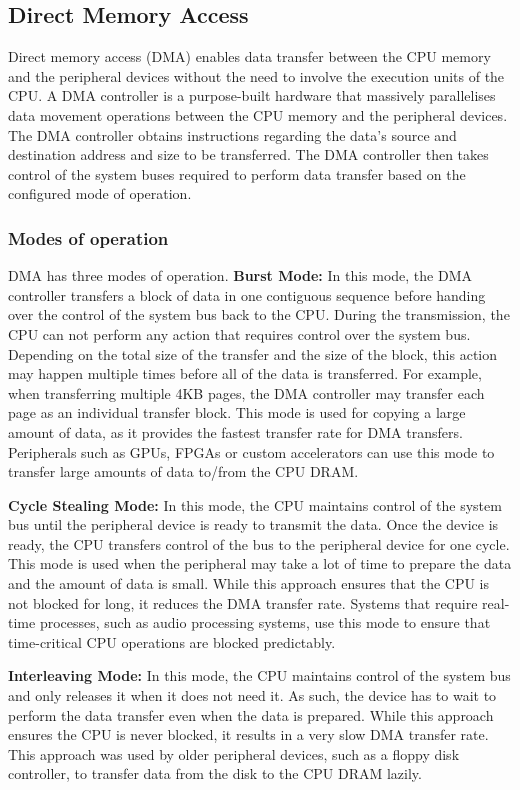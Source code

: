 \subsection{Direct Memory Access}
\label{subsec:interconnect-sc-background-dma}

Direct memory access (DMA) enables data transfer between the CPU memory and the peripheral devices without the need to involve the execution units of the CPU.
A DMA controller is a purpose-built hardware that massively parallelises data movement operations between the CPU memory and the peripheral devices.
The DMA controller obtains instructions regarding the data's source and destination address and size to be transferred.
The DMA controller then takes control of the system buses required to perform data transfer based on the configured mode of operation.

\subsubsection{Modes of operation}
DMA has three modes of operation.
\textbf{Burst Mode:} In this mode, the DMA controller transfers a block of data in one contiguous sequence before handing over the control of the system bus back to the CPU.
During the transmission, the CPU can not perform any action that requires control over the system bus.
Depending on the total size of the transfer and the size of the block, this action may happen multiple times before all of the data is transferred.
For example, when transferring multiple 4KB pages, the DMA controller may transfer each page as an individual transfer block.
This mode is used for copying a large amount of data, as it provides the fastest transfer rate for DMA transfers.
Peripherals such as GPUs, FPGAs or custom accelerators can use this mode to transfer large amounts of data to/from the CPU DRAM.

\textbf{Cycle Stealing Mode:} In this mode, the CPU maintains control of the system bus until the peripheral device is ready to transmit the data.
Once the device is ready, the CPU transfers control of the bus to the peripheral device for one cycle.
This mode is used when the peripheral may take a lot of time to prepare the data and the amount of data is small.
While this approach ensures that the CPU is not blocked for long, it reduces the DMA transfer rate.
Systems that require real-time processes, such as audio processing systems, use this mode to ensure that time-critical CPU operations are blocked predictably.

\textbf{Interleaving Mode:} In this mode, the CPU maintains control of the system bus and only releases it when it does not need it.
As such, the device has to wait to perform the data transfer even when the data is prepared.
While this approach ensures the CPU is never blocked, it results in a very slow DMA transfer rate.
This approach was used by older peripheral devices, such as a floppy disk controller, to transfer data from the disk to the CPU DRAM lazily.